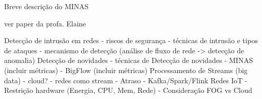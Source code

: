 Breve descrição do MINAS \cite{Faria2016}

ver paper da profa. Elaine

Detecção de intrusão em redes
    - riscos de segurança
    - técnicas de intrusão e tipos de ataques
    - mecanismo de detecção (análise de fluxo de rede -> detecção de anomalia)
Detecção de novidades
    - técnicas de Detecção de novidades
    - MINAS (incluir métricas) 
    - BigFlow (incluir métricas)
Processamento de Streams (big data)
    - cloud?
    - redes como stream
    - Atraso
    - Kafka/Spark/Flink
Redes IoT
    - Restrição hardware (Energia, CPU, Mem, Rede)
    - Consideração FOG vs Cloud
